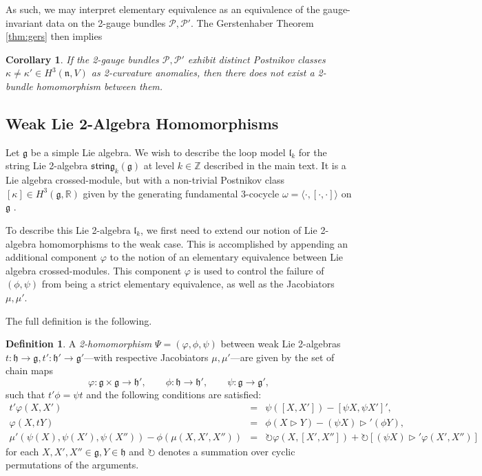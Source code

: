 \documentclass[onecolumn]{article}
\theoremstyle{theorem}
\newtheorem{corollary}{Corollary}[section]
\theoremstyle{remark}
\theoremstyle{example}
\theoremstyle{definition}
\newtheorem{definition}{Definition}[section]
\numberwithin{equation}{section}
\def\bbZ{\mathbb{Z}}
\begin{document}
As such, we may interpret elementary equivalence as an equivalence of the gauge-invariant data on the 2-gauge bundles $\mathcal{P},\mathcal{P}'$. The { {Gerstenhaber Theorem} \ref{thm:gers}} then implies
\begin{corollary}
If the 2-gauge bundles $\mathcal{P},\mathcal{P}'$ exhibit distinct Postnikov classes $\kappa\neq \kappa' \in H^3(\mathfrak{n},V)$ as 2-curvature anomalies, then there does {\it not} exist a 2-bundle homomorphism between them.
\end{corollary}


\subsection{Weak Lie 2-Algebra Homomorphisms}
Let $\mathfrak{g}$ be a simple Lie algebra. We wish to describe the loop model $\mathfrak{l}_k$ for the string Lie 2-algebra $\mathfrak{string}_k(\mathfrak{g})$ at level $k\in\bbZ$ described in the main text. It is a Lie algebra crossed-module, but with a non-trivial Postnikov class $[\kappa]\in H^3(\mathfrak{g},\mathbb{R})$ given by the generating fundamental 3-cocycle $\omega=\langle \cdot,[\cdot,\cdot]\rangle$ on $\mathfrak{g}$ \cite{book-loop}.

To describe this Lie 2-algebra $\mathfrak{l}_k$, we first need to extend our notion of Lie 2-algebra homomorphisms to the weak case. This is accomplished by appending an additional component $\varphi$ to the notion of an elementary equivalence between Lie algebra crossed-modules. This component $\varphi$ is used to control the failure of $(\phi,\psi)$ from being a strict elementary equivalence, as well as the Jacobiators $\mu,\mu'$. 

The full definition is \cite{Baez:2005sn} the following.
\begin{definition}\label{def:weakequiv}
A {\it 2-homomorphism}  $\Psi=(\varphi,\phi,\psi)$ between weak Lie 2-algebras $t:\mathfrak{h}\rightarrow\mathfrak{g},t':\mathfrak{h}'\rightarrow\mathfrak{g}'$---with respective Jacobiators $\mu,\mu'$---are given by the set of chain maps
\begin{equation}
    \varphi: \mathfrak{g}\times\mathfrak{g}\rightarrow\mathfrak{h}',\qquad \phi:\mathfrak{h} \rightarrow\mathfrak{h}',\qquad \psi:\mathfrak{g}\rightarrow\mathfrak{g}',\nonumber
\end{equation}
such that $t'\phi = \psi t$ and the following conditions are satisfied:\vspace{-12pt}
\begin{eqnarray}
    t'\varphi(X,X') &=& \psi([X,X']) - [\psi X,\psi X']',\nonumber \\
    \varphi(X,tY) &=& \phi(X\rhd Y) - (\psi X)\rhd' (\phi Y),\nonumber \\
    \mu'(\psi(X),\psi(X'),\psi(X'')) - \phi(\mu(X,X',X'')) &=& \circlearrowright\varphi(X,[X',X'']) + \circlearrowright [(\psi X)\rhd'\varphi(X',X'')]\label{weak2hom}
\end{eqnarray}
for each $X,X',X''\in\mathfrak{g},Y\in\mathfrak{h}$ and $\circlearrowright$ denotes a summation over cyclic permutations of the arguments.
\end{definition}
\end{document}
